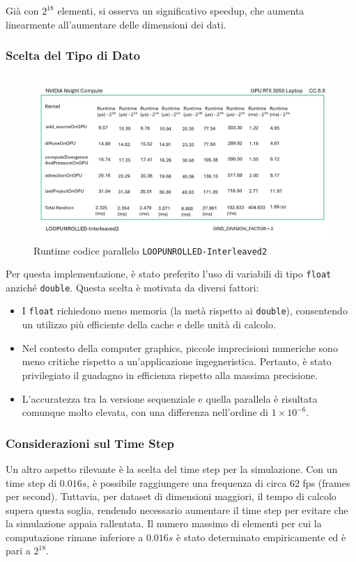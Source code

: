 \documentclass[12pt,a4paper,openany,twoside]{article}
\begin{document}
Già con \(2^{18}\) elementi, si osserva un significativo speedup, che aumenta linearmente all'aumentare delle dimensioni dei dati.

\subsubsection{Scelta del Tipo di Dato}

\begin{figure}
    \centering
    \includegraphics[width=0.75\linewidth]{figures/Slide10.jpg}
    \caption{Runtime codice parallelo \texttt{LOOPUNROLLED-Interleaved2}}
    \label{fig:11}
\end{figure}

Per questa implementazione, è stato preferito l'uso di variabili di tipo \texttt{float} anziché \texttt{double}. Questa scelta è motivata da diversi fattori:
\begin{itemize}
    \item I \texttt{float} richiedono meno memoria (la metà rispetto ai \texttt{double}), consentendo un utilizzo più efficiente della cache e delle unità di calcolo.
    \item Nel contesto della computer graphics, piccole imprecisioni numeriche sono meno critiche rispetto a un'applicazione ingegneristica. Pertanto, è stato privilegiato il guadagno in efficienza rispetto alla massima precisione.
    \item L'accuratezza tra la versione sequenziale e quella parallela è risultata comunque molto elevata, con una differenza nell'ordine di \(1 \times 10^{-6}\).
\end{itemize}

\subsubsection{Considerazioni sul Time Step}
Un altro aspetto rilevante è la scelta del time step per la simulazione. Con un time step di \(0.016s\), è possibile raggiungere una frequenza di circa \(62\) fps (frames per second). Tuttavia, per dataset di dimensioni maggiori, il tempo di calcolo supera questa soglia, rendendo necessario aumentare il time step per evitare che la simulazione appaia rallentata. Il numero massimo di elementi per cui la computazione rimane inferiore a \(0.016s\) è stato determinato empiricamente ed è pari a \(2^{18}\).
\end{document}
